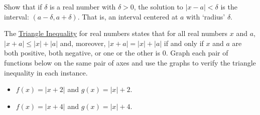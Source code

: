 \documentclass{ximera}
\begin{document}
\begin{problem}
Show that if $\delta$ is a real number with $\delta > 0$, the solution to $|x-a| < \delta$ is the interval:  $(a - \delta, a + \delta)$.  That is, an interval centered at $a$ with `radius' $\delta$.  
\end{problem}  

\begin{problem}\label{triangleinequalityreals}
The \href{http://en.wikipedia.org/wiki/Triangle_inequality}{\underline{Triangle Inequality}}  for real numbers states that for all real numbers $x$ and $a$, $|x+a| \leq |x| + |a|$ and, moreover, $|x+a| = |x|+|a|$ if and only if $x$ and $a$ are both positive, both negative, or one or the other is $0$.  Graph each pair of functions below on the same pair of axes and use the graphs to verify the triangle inequality in each instance.

\begin{itemize}

\item  $f(x) = |x+2|$ and $g(x) = |x|+2$.

\item  $f(x) = |x+4|$ and $g(x) = |x|+4$.

\end{itemize}

\end{problem}
\end{document}
